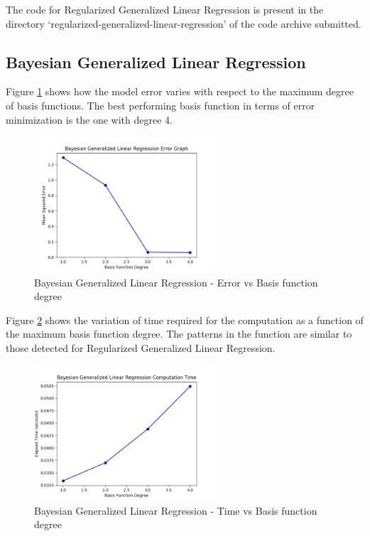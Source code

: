 \documentclass[parskip=full]{scrartcl}
\begin{document}
        The code for Regularized Generalized Linear Regression is present in the directory `regularized-generalized-linear-regression' of the code archive submitted.


    \subsection{Bayesian Generalized Linear Regression} %
    \label{sub:bayesian_generalized_linear_regression}
    
        Figure \ref{fig:bglg_err_v_deg} shows how the model error varies with respect to the maximum degree of basis functions. The best performing basis function in terms of error minimization is the one with degree 4.

        \begin{figure}[ht]
            \centering
            \includegraphics[width=0.6\textwidth]{3b_degree_vs_error.png}
            \caption{Bayesian Generalized Linear Regression - Error vs Basis function degree}
            \label{fig:bglg_err_v_deg}
        \end{figure}

        Figure \ref{fig:bglg_time_v_deg} shows the variation of time required for the computation as a function of the maximum basis function degree. The patterns in the function are similar to those detected for Regularized Generalized Linear Regression. 

        \begin{figure}[ht]
            \centering
            \includegraphics[width=0.6\textwidth]{3b_degree_vs_time.png}
            \caption{Bayesian Generalized Linear Regression - Time vs Basis function degree}
            \label{fig:bglg_time_v_deg}
        \end{figure}
\end{document}
